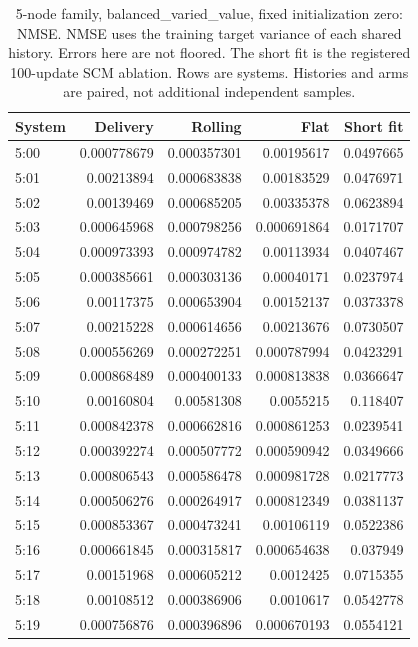 \begin{table}[ht]
\centering\scriptsize
\begin{tabular}{lrrrr}
\toprule
System & Delivery & Rolling & Flat & Short fit\\
\midrule
5:00 & 0.000778679 & 0.000357301 & 0.00195617 & 0.0497665\\
5:01 & 0.00213894 & 0.000683838 & 0.00183529 & 0.0476971\\
5:02 & 0.00139469 & 0.000685205 & 0.00335378 & 0.0623894\\
5:03 & 0.000645968 & 0.000798256 & 0.000691864 & 0.0171707\\
5:04 & 0.000973393 & 0.000974782 & 0.00113934 & 0.0407467\\
5:05 & 0.000385661 & 0.000303136 & 0.00040171 & 0.0237974\\
5:06 & 0.00117375 & 0.000653904 & 0.00152137 & 0.0373378\\
5:07 & 0.00215228 & 0.000614656 & 0.00213676 & 0.0730507\\
5:08 & 0.000556269 & 0.000272251 & 0.000787994 & 0.0423291\\
5:09 & 0.000868489 & 0.000400133 & 0.000813838 & 0.0366647\\
5:10 & 0.00160804 & 0.00581308 & 0.0055215 & 0.118407\\
5:11 & 0.000842378 & 0.000662816 & 0.000861253 & 0.0239541\\
5:12 & 0.000392274 & 0.000507772 & 0.000590942 & 0.0349666\\
5:13 & 0.000806543 & 0.000586478 & 0.000981728 & 0.0217773\\
5:14 & 0.000506276 & 0.000264917 & 0.000812349 & 0.0381137\\
5:15 & 0.000853367 & 0.000473241 & 0.00106119 & 0.0522386\\
5:16 & 0.000661845 & 0.000315817 & 0.000654638 & 0.037949\\
5:17 & 0.00151968 & 0.000605212 & 0.0012425 & 0.0715355\\
5:18 & 0.00108512 & 0.000386906 & 0.0010617 & 0.0542778\\
5:19 & 0.000756876 & 0.000396896 & 0.000670193 & 0.0554121\\
\bottomrule
\end{tabular}
\caption{5-node family, balanced\_varied\_value, fixed initialization zero: NMSE. NMSE uses the training target variance of each shared history. Errors here are not floored. The short fit is the registered 100-update SCM ablation. Rows are systems. Histories and arms are paired, not additional independent samples.}
\end{table}
